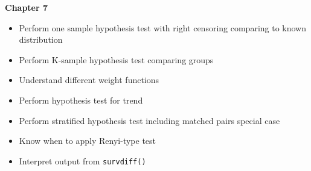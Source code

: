 \documentclass[11pt]{article}
\begin{document}
\textbf{Chapter 7}
\begin{itemize}
\item Perform one sample hypothesis test with right censoring comparing to known distribution

\item Perform K-sample hypothesis test comparing groups

\item Understand different weight functions

\item Perform hypothesis test for trend

\item Perform stratified hypothesis test including matched pairs
special case

\item Know when to apply Renyi-type test

\item Interpret output from \verb|survdiff()|
\end{itemize}
\end{document}
